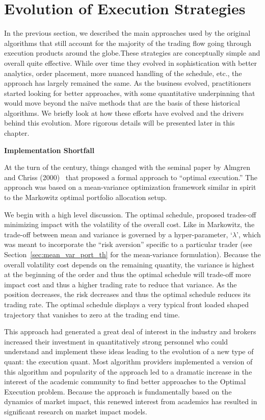 \section{Evolution of Execution Strategies}

In the previous section, we described the main approaches used by the original algorithms that still account for the majority of the trading flow going through execution products around the globe.These strategies are conceptually simple and overall quite effective. While over time they evolved in sophistication with better analytics, order placement, more nuanced handling of the schedule, etc., the approach has largely remained the same. As the business evolved, practitioners started looking for better approaches, with some quantitative underpinning that would move beyond the na\"ive methods that are the basis of these historical algorithms. We briefly look at how these efforts have evolved and the drivers behind this evolution. More rigorous details will be presented later in this chapter. \twomedskip


\noindent\textbf{Implementation Shortfall} \twomedskip


At the turn of the century, things changed with the seminal paper by Almgren and Chriss (2000)~\cite{alm2000} that proposed a formal approach to ``optimal execution.'' The approach was based on a  mean-variance optimization framework similar in spirit to the Markowitz optimal portfolio allocation setup.


We begin with a high level discussion. The optimal schedule, proposed trades-off minimizing impact with the volatility of the overall cost. Like in Markowitz, the trade-off between mean and variance is governed by a hyper-parameter, `$\lambda$', which was meant to incorporate the ``risk aversion'' specific to a particular trader (see Section~\ref{sec:mean_var_port_th} for the mean-variance formulation). Because the overall volatility cost depends on the remaining quantity, the variance is highest at the beginning of the order and thus the optimal schedule will trade-off more impact cost and thus a higher trading rate to reduce that variance. As the position decreases, the risk decreases and thus the optimal schedule reduces its trading rate. The optimal schedule displays a very typical front loaded shaped trajectory that vanishes to zero at the trading end time.


This approach had generated a great deal of interest in the industry and brokers increased their investment in quantitatively strong personnel who could understand and implement these ideas leading to the evolution of a new type of quant: the execution quant. Most algorithm providers implemented a version of this algorithm and popularity of the approach led to a dramatic increase in the interest of the academic community to find better approaches to the Optimal Execution problem. Because the approach is fundamentally based on the dynamics of market impact, this renewed interest from academics has resulted in significant research on market impact models. 


